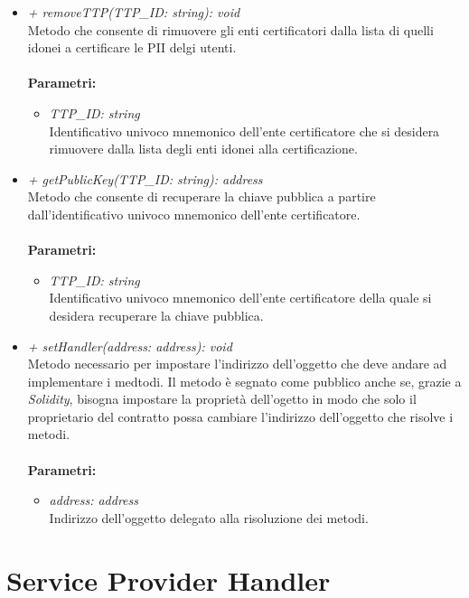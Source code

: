 \begin{itemize}
\begin{itemize}
\begin{itemize}
		\end{itemize}
		\item \textit{+ removeTTP(TTP\_ID: string): void}\\
		Metodo che consente di rimuovere gli enti certificatori dalla lista di quelli idonei a certificare le \gls{PII} delgi utenti.\\\\
		\textbf{Parametri:}
		\begin{itemize}
			\item \textit{TTP\_ID: string}\\
			Identificativo univoco mnemonico dell'ente certificatore che si desidera rimuovere dalla lista degli enti idonei alla certificazione.
		\end{itemize}
		\item \textit{+ getPublicKey(TTP\_ID: string): address}\\
		Metodo che consente di recuperare la chiave pubblica a partire dall'identificativo univoco mnemonico dell'ente certificatore.\\\\
		\textbf{Parametri:}
		\begin{itemize}
			\item \textit{TTP\_ID: string}\\
			Identificativo univoco mnemonico dell'ente certificatore della quale si desidera recuperare la chiave pubblica.
		\end{itemize}
		\item \textit{+ setHandler(address: address): void}\\
		Metodo necessario per impostare l'indirizzo dell'oggetto che deve andare ad implementare i medtodi. Il metodo è segnato come pubblico anche se, grazie a \textit{Solidity}, bisogna impostare la proprietà dell'ogetto in modo che solo il proprietario del contratto possa cambiare l'indirizzo dell'oggetto che risolve i metodi.\\\\
		\textbf{Parametri:}
		\begin{itemize}
			\item \textit{address: address}\\
			Indirizzo dell'oggetto delegato alla risoluzione dei metodi.
		\end{itemize}
	\end{itemize}
\end{itemize}
\section{Service Provider Handler}

